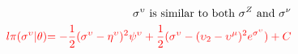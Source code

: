 \begin{align*}
\text{$\sigma^{\upsilon}$ is similar to both $\sigma^{Z}$ and $\sigma^{\nu}$}\\
\color{red}{l\pi(\sigma^{\upsilon}|\theta)}
\color{red}{
=-\frac{1}{2}(\sigma^{\upsilon}-\eta^{\upsilon})^{2}\psi^{\upsilon}
+
\frac{1}{2}(\sigma^{\upsilon} -(\upsilon_{2}-\upsilon^{\mu})^{2}e^{\sigma^{\upsilon}})
+C}
\end{align*}

